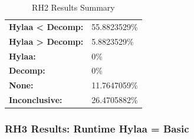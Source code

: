 \documentclass{article}\usepackage[]{graphicx}\usepackage[]{color}
\begin{document}
	\begin{table}[H]
	\centering
	\caption{RH2 Results Summary}
	\begin{tabular}{ll}
	\textbf{Hylaa \textless{} Decomp:}& 55.8823529\% \\
	\textbf{Hylaa \textgreater{} Decomp:}& 5.8823529\%\\
	\textbf{Hylaa:} & 0\%\\
	\textbf{Decomp:} & 0\%\\
	\textbf{None:}& 11.7647059\%\\
	\textbf{Inconclusive:}& 26.4705882\%
			
	
	\end{tabular}
	\end{table}
	
	
	

	
	\subsubsection{RH3 Results: Runtime Hylaa = Basic}
	
\end{document}
